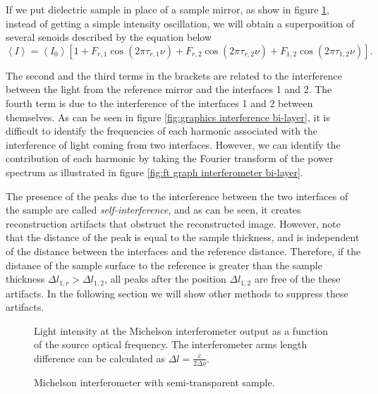 \documentclass[12pt,twoside,english]{book}
\renewcommand{\~}{\perispomeni}%
\numberwithin{equation}{section}
\numberwithin{figure}{section}
\begin{document}
If we put dielectric sample in place of a sample mirror, as show in figure \ref{fig:InterferometerBiLayer}, instead of getting a simple intensity oscillation, we will obtain a superposition of several senoids described by the equation below
\begin{equation}
\left\langle I\right\rangle =\left\langle I_{0}\right\rangle \left[1+F_{r,1}\cos\left(2\pi\tau_{r,1}\nu\right)+F_{r,2}\cos\left(2\pi\tau_{r,2}\nu\right)+F_{1,2}\cos\left(2\pi\tau_{1,2}\nu\right)\right].\end{equation}
 
The second and the third terms in the brackets are related to the interference between the light from the reference mirror and the interfaces 1 and 2. The fourth term is due to the interference of the interfaces 1 and 2 between themselves. As can be seen in figure \ref{fig:graphics interference bi-layer}, it is difficult to identify the frequencies of each harmonic associated with the interference of light coming from two interfaces. However, we can identify the contribution of each harmonic by taking the Fourier transform of the power spectrum as illustrated in figure \ref{fig:ft graph interferometer bi-layer}.

The presence of the peaks due to the interference between the two interfaces of the sample are called \emph{self-interference}, and as can be seen, it creates reconstruction artifacts that obstruct the reconstructed image. However, note that the distance of the peak is equal to the sample thickness, and is independent of the distance between the interfaces and the reference distance. Therefore, if the distance of the sample surface to the reference is greater than the sample thickness $\Delta l_{1,r}>\Delta l_{1,2}$, all peaks after the position $\Delta l_{1,2}$ are free of the these artifacts. In the following section we will show other methods to suppress these artifacts.

%
\begin{figure}[h]
%
\begin{minipage}[t]{0.48\columnwidth}%
\caption{Light intensity at the Michelson interferometer output as a function
of the source optical frequency. The interferometer arms length difference
can be calculated as $\Delta l=\frac{c}{2\Delta\nu}$.\label{fig:freqGraphSimple}}
%
\end{minipage}\hfill{}%
\begin{minipage}[t]{0.48\columnwidth}%
\caption{Michelson interferometer with semi-transparent sample.\label{fig:InterferometerBiLayer}}
%
\end{minipage}
\end{figure}
\end{document}
